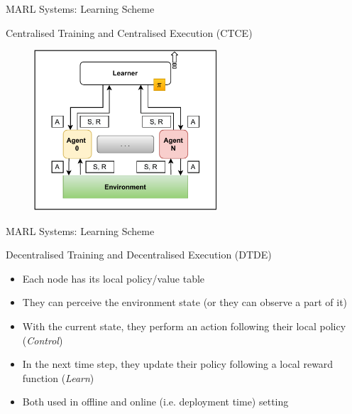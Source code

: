 \documentclass[presentation, 8pt]{beamer}\mode<presentation>{\usetheme{AMSBolognaFC}}
\begin{document}
	\begin{frame}{MARL Systems: Learning Scheme}
		\begin{exampleblock}{Centralised Training and Centralised Execution (CTCE)}
			\begin{figure}
				\includegraphics[height=6cm]{img/learning-scheme-clce.pdf}
			\end{figure}
		\end{exampleblock}
	\end{frame}
	
	\begin{frame}{MARL Systems: Learning Scheme}
		
		\begin{exampleblock}{Decentralised Training and Decentralised Execution (DTDE)}
			\begin{itemize}
				\item Each node has its local policy/value table
				\item They can perceive the environment state (or they can observe a part of it)
				\item With the current state, they perform an action following their local policy (\emph{Control})
				\item In the next time step, they update their policy following a local reward function (\emph{Learn})
				\item Both used in offline and online (i.e. deployment time) setting
			\end{itemize}
		\end{exampleblock}
	\end{frame}
	
\end{document}
